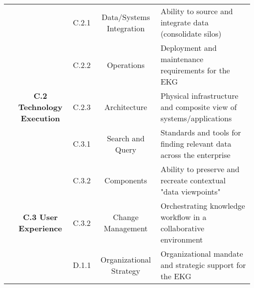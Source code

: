 \begin{table}[ht]
\begin{tabular}{@{}cclcl@{}}
    \cellcolor[HTML]{BF9000}{}                                            & \cellcolor[HTML]{FFD965}                                                           & \cellcolor[HTML]{FFE598}C.2.1 & \cellcolor[HTML]{FFE598}Data/Systems Integration     & \cellcolor[HTML]{FEF2CB}Ability to source and integrate data (consolidate silos)               \\
    \cellcolor[HTML]{BF9000}{}                                            & \cellcolor[HTML]{FFD965}                                                           & \cellcolor[HTML]{FFE598}C.2.2 & \cellcolor[HTML]{FFE598}Operations                   & \cellcolor[HTML]{FEF2CB}Deployment and maintenance requirements for the EKG                    \\
    \cellcolor[HTML]{BF9000}{}                                            & \multirow{-3}{*}{\cellcolor[HTML]{FFD965}\textbf{C.2 Technology Execution}}        & \cellcolor[HTML]{FFE598}C.2.3 & \cellcolor[HTML]{FFE598}Architecture                 & \cellcolor[HTML]{FEF2CB}Physical infrastructure and composite view of systems/applications     \\
    \cellcolor[HTML]{BF9000}{}                                            & \cellcolor[HTML]{FFD965}                                                           & \cellcolor[HTML]{FFE598}C.3.1 & \cellcolor[HTML]{FFE598}Search and Query             & \cellcolor[HTML]{FEF2CB}Standards and tools for finding relevant data across the enterprise    \\
    \cellcolor[HTML]{BF9000}{}                                            & \cellcolor[HTML]{FFD965}                                                           & \cellcolor[HTML]{FFE598}C.3.2 & \cellcolor[HTML]{FFE598}Components                   & \cellcolor[HTML]{FEF2CB}Ability to preserve and recreate contextual "data viewpoints"          \\
    \multirow{-10}{*}{\cellcolor[HTML]{BF9000}{
        \rotatebox{90}{\textbf{C. TECHNOLOGY}}}}                          & \multirow{-3}{*}{\cellcolor[HTML]{FFD965}\textbf{C.3 User Experience}}             & \cellcolor[HTML]{FFE598}C.3.2 & \cellcolor[HTML]{FFE598}Change Management            & \cellcolor[HTML]{FEF2CB}Orchestrating knowledge workflow in a collaborative environment        \\
    \cellcolor[HTML]{A5A5A5}{}                                            & \cellcolor[HTML]{BFBFBF}                                                           & \cellcolor[HTML]{D8D8D8}D.1.1 & \cellcolor[HTML]{D8D8D8}Organizational Strategy      & \cellcolor[HTML]{F2F2F2}Organizational mandate and strategic support for the EKG               \\

\end{tabular}
\end{table}
